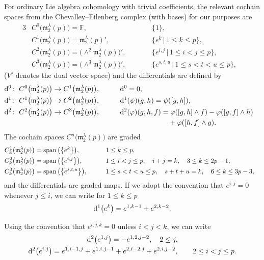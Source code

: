 \documentclass[10pt,a4paper]{amsart}
\def\spn{\mathop{\rm span}}
\def\phi{\varphi}
\def\m{\mathfrak m}
\def\F{\mathbb F}
\numberwithin{equation}{section}
\begin{document}
For ordinary Lie algebra cohomology with trivial coefficients, the relevant cochain spaces from the Chevalley--Eilenberg complex (with bases) for our purposes are
\begin{alignat*}{3}
& C^0\big(\m_2^\lambda(p)\big)= \F, \qquad && \{1\},&\\
& C^1\big(\m_2^\lambda(p)\big)= \m_2^\lambda(p)', \qquad && \big\{e^k\, |\, 1\le k\le p\big\},&\\
& C^2\big(\m_2^\lambda(p)\big)= \big({\wedge}^2\m_2^\lambda(p)\big)',\qquad && \big\{e^{i,j}\, |\, 1\le i<j\le p\big\},&\\
& C^3\big(\m_2^\lambda(p)\big)= \big({\wedge}^3\m_2^\lambda(p)\big)', \qquad && \big\{e^{s,t,u}\, |\, 1\le s<t<u\le p\big\},&
\end{alignat*}
($V'$ denotes the dual vector space) and the differentials are defined by
\begin{alignat*}{3}
& {\rm d}^0\colon \ C^0\big(\m_2^\lambda(p)\big)\to C^1\big(\m_2^\lambda(p)\big), \qquad && {\rm d}^0=0,&\\
& {\rm d}^1\colon \ C^1\big(\m_2^\lambda(p)\big)\to C^2\big(\m_2^\lambda(p)\big), \qquad && {\rm d}^1(\psi)(g,h)=\psi([g,h]),&\\
& {\rm d}^2\colon \ C^2\big(\m_2^\lambda(p)\big)\to C^3\big(\m_2^\lambda(p)\big), \qquad && {\rm d}^2(\phi)(g,h,f)=\phi([g,h]\wedge f)-\phi([g,f]\wedge h)&\\
&&& \hphantom{{\rm d}^2(\phi)(g,h,f)=}{} +\phi([h,f]\wedge g).&
\end{alignat*}
The cochain spaces $C^n\big(\m_2^\lambda(p)\big)$ are graded
\begin{alignat*}{3}
& C^1_k\big(\m_2^\lambda(p)\big)=\spn\big(\big\{e^k\big\}\big),\qquad && 1\le k\le p, &\\
& C^2_k\big(\m_2^\lambda(p)\big)=\spn\big(\big\{e^{i,j}\big\}\big),\qquad && 1\le i<j \le p,\quad i+j=k, \quad 3\le k\le 2p-1, &\\
& C^3_k\big(\m_2^\lambda(p)\big)=\spn\big(\big\{e^{s,t,u}\big\}\big),\qquad && 1\le s<t<u \le p, \quad s+t+u=k, \quad 6\le k\le 3p-3,&
\end{alignat*}
and the differentials are graded maps. If we adopt the convention that $e^{i,j}=0$ whenever $j\le i$, we can write for $1\le k\le p$
\begin{gather}\label{1-coboundary}
 {\rm d}^1\big(e^k\big)=e^{1,k-1}+e^{2,k-2}.
\end{gather}

Using the convention that $e^{i,j,k}=0$ unless $i<j<k$, we can write
\begin{gather}
 {\rm d}^2\big(e^{1,j}\big) = -e^{1,2,j-2}, \quad 2\le j,\nonumber\\
 {\rm d}^2\big(e^{i,j}\big) =e^{1,i-1,j}+e^{1,i,j-1}+e^{2,i-2,j}+e^{2,i,j-2}, \qquad 2\le i<j\le p. \label{2-coboundary}
\end{gather}
\end{document}
